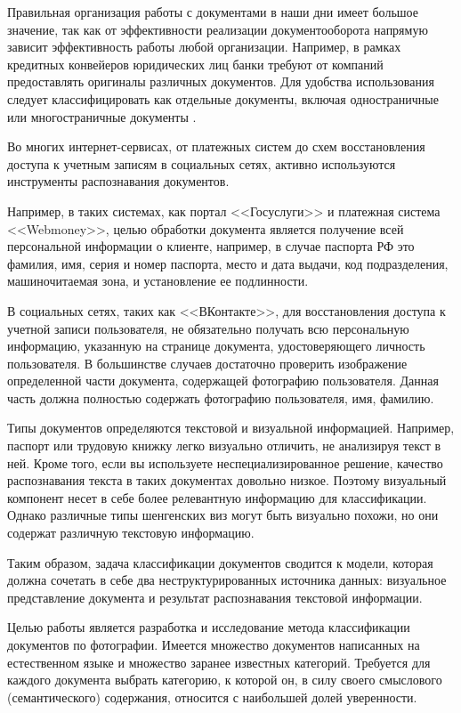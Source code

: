 \Introduction

Правильная организация работы с документами в наши дни имеет большое значение, так как от эффективности реализации документооборота напрямую зависит эффективность работы любой организации. Например, в рамках кредитных конвейеров юридических лиц банки требуют от компаний предоставлять оригиналы различных документов. Для удобства использования следует классифицировать как отдельные документы, включая одностраничные или многостраничные документы \cite{bank}.

Во многих интернет-сервисах, от платежных систем до схем восстановления доступа к учетным записям в социальных сетях, активно используются инструменты распознавания документов. 

Например, в таких системах, как портал <<Госуслуги>>\cite{gosuslugi} и платежная система <<Webmoney>>\cite{webmoney}, целью обработки документа является получение всей персональной информации о клиенте, например, в случае паспорта РФ это фамилия, имя, серия и номер паспорта, место и дата выдачи, код подразделения, машиночитаемая зона, и установление ее подлинности. 

В социальных сетях, таких как <<ВКонтакте>>\cite{vk}, для восстановления доступа к учетной записи пользователя, не обязательно получать всю персональную информацию, указанную на странице документа, удостоверяющего личность пользователя. В большинстве случаев достаточно проверить изображение определенной части документа, содержащей фотографию пользователя. Данная часть должна полностью содержать фотографию пользователя, имя, фамилию. 

Типы документов определяются текстовой и визуальной информацией. Например, паспорт или трудовую книжку легко визуально отличить, не анализируя текст в ней. Кроме того, если вы используете неспециализированное решение, качество распознавания текста в таких документах довольно низкое. Поэтому визуальный компонент несет в себе более релевантную информацию для классификации. Однако различные типы шенгенских виз могут быть визуально похожи, но они содержат различную текстовую информацию.

Таким образом, задача классификации документов сводится к модели, которая должна сочетать в себе два неструктурированных источника данных: визуальное представление документа и результат распознавания текстовой информации.

Целью работы является разработка и исследование метода классификации документов по фотографии. Имеется множество документов написанных на естественном языке и множество заранее известных категорий. Требуется для каждого документа выбрать категорию, к которой он, в силу своего смыслового (семантического) содержания, относится с наибольшей долей уверенности.

